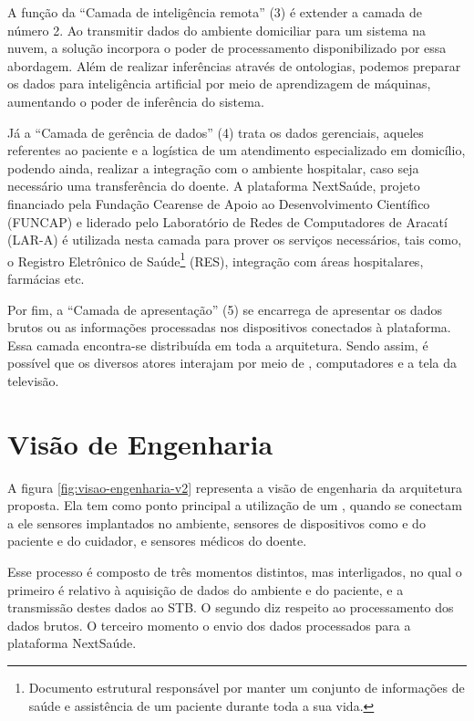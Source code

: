 A função da ``Camada de inteligência remota'' (3) é extender a camada de
número 2. Ao transmitir dados do ambiente domiciliar para um sistema na nuvem,
a solução incorpora o poder de processamento disponibilizado por essa
abordagem. Além de realizar inferências através de ontologias, podemos
preparar os dados para inteligência artificial por meio de aprendizagem de
máquinas, aumentando o poder de inferência do sistema.

Já a ``Camada de gerência de dados'' (4) trata os dados gerenciais, aqueles
referentes ao paciente e a logística de um atendimento especializado em
domicílio, podendo ainda, realizar a integração com o ambiente hospitalar, caso
seja necessário uma transferência do doente. A plataforma NextSaúde,
projeto financiado pela Fundação Cearense de Apoio ao Desenvolvimento Científico 
(FUNCAP) e liderado pelo Laboratório de Redes de Computadores de Aracatí (LAR-A) 
é utilizada nesta camada para prover os serviços necessários, tais como, o 
Registro Eletrônico de Saúde\footnote{Documento estrutural responsável por 
manter um conjunto de informações de saúde e assistência de um paciente durante 
toda a sua vida.} (RES), integração com áreas hospitalares, farmácias etc.

Por fim, a ``Camada de apresentação'' (5) se encarrega de apresentar os dados brutos
ou as informações processadas nos dispositivos conectados à plataforma. Essa
camada encontra-se distribuída em toda a arquitetura. Sendo assim, é possível
que os diversos atores interajam por meio de \smartphones, computadores e
a tela da televisão.

\section{Visão de Engenharia} \label{sec:visao-engenharia}

A figura \ref{fig:visao-engenharia-v2} representa a visão de engenharia da arquitetura
proposta. Ela tem como ponto principal a utilização de um \stb[], quando se
conectam a ele sensores  implantados no ambiente, sensores de dispositivos como
\smartphones[] e  \smartwatches[] do paciente e do cuidador, e sensores médicos
do doente.


Esse processo é composto de três momentos distintos, mas  interligados, no qual
o primeiro é relativo à aquisição de dados do ambiente e do paciente, e a
transmissão destes dados ao STB. O segundo diz respeito ao processamento dos
dados brutos. O terceiro momento o envio dos dados processados para a plataforma
NextSaúde.

